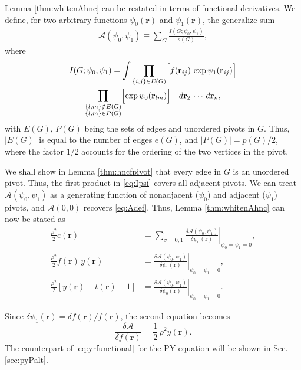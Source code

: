 \documentclass[aip,jcp,reprint,superscriptaddress]{revtex4-1}
\newcommand{\vct}[1]{\mathbf{#1}}
\providecommand{\vr}{} %
\renewcommand{\vr}{\vct{r}}
\newcommand{\A}{\mathcal{A}}
\begin{document}
Lemma \ref{thm:whitenAhnc} can be
restated in terms of functional derivatives.
%
We define, for two arbitrary functions $\psi_0(\vr)$ and $\psi_1(\vr)$,
the generalize sum
\begin{align}
  \A(\psi_0, \psi_1)
\equiv
  \sum_G \frac{ I(G; \psi_0, \psi_1) } { s(G) },
\label{eq:Apsi}
\end{align}
where
\begin{multline}
  I(G; \psi_0, \psi_1)
=
  \int
    \prod_{\{i, j\} \in E(G)}
    \Bigl[
      f(\vr_{ij}) \, \exp \psi_1(\vr_{ij})
    \Bigr]
  \\
    \prod_{
      \substack{
        \{l, m\} \notin E(G) \\
        \{l, m\} \in P(G)
      }
    }
    \Bigl[
      \exp \psi_0(\vr_{lm})
    \Bigr]
  \quad
  d\vr_2 \, \cdots \, d\vr_n,
  \label{eq:Ipsi}
\end{multline}
with $E(G)$, $P(G)$ being the sets of edges and unordered pivots in $G$.
%
Thus, $|E(G)|$ is equal to the number of edges $e(G)$,
and $|P(G)| = p(G)/2$,
where the factor $1/2$ accounts for the ordering
of the two vertices in the pivot.



We shall show in Lemma \ref{thm:hncfpivot} that
every edge in $G$ is an unordered pivot.
%
Thus,
the first product in \eqref{eq:Ipsi}
covers all adjacent pivots.
%
We can treat
$\A(\psi_0, \psi_1)$
as a generating function
of nonadjacent ($\psi_0$) and adjacent ($\psi_1$) pivots,
%
and $\A(0,0)$ recovers \eqref{eq:Adef}.
%
Thus, Lemma \ref{thm:whitenAhnc} can now be stated as
\begin{align*}
  \frac{\rho^2}{2} c(\vr)
&=
  \left.
  \sum_{\sigma = 0, 1}
  \frac{ \delta \A(\psi_0, \psi_1) } { \delta \psi_\sigma(\vr) }
  \right|_{\psi_0 = \psi_1 = 0},
\\
%
%
%
  \frac{\rho^2}{2} f(\vr) \, y(\vr)
&=
  \left.
  \frac{ \delta \A(\psi_0, \psi_1) } { \delta \psi_1(\vr) }
  \right|_{\psi_0 = \psi_1 = 0},
\\
%
%
%
  \frac{\rho^2}{2}[ y(\vr) - t(\vr) - 1 ]
&=
  \left.
  \frac{ \delta \A(\psi_0, \psi_1) } { \delta \psi_0(\vr) }
  \right|_{\psi_0 = \psi_1 = 0}.
\end{align*}

Since $\delta \psi_1(\vr) = \delta f(\vr)/ f(\vr)$,
the second equation becomes
\begin{equation}
  \frac{ \delta \A } { \delta f(\vr) }
  = \frac{1}{2} \, \rho^2 y(\vr).
  \label{eq:yrfunctional}
\end{equation}
The counterpart of \eqref{eq:yrfunctional} for the PY equation
will be shown in Sec. \ref{sec:pyPalt}.
\end{document}
